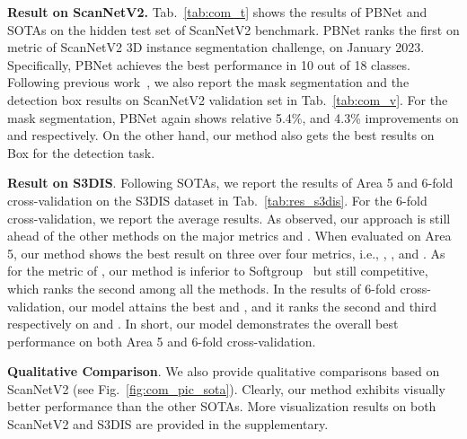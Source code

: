 \documentclass[10pt,twocolumn,letterpaper]{article}
\begin{document}
\noindent\textbf{Result on ScanNetV2.} Tab.~\ref{tab:com_t} shows the  results of PBNet and SOTAs on the hidden test set of ScanNetV2 benchmark. PBNet ranks the first on   metric of ScanNetV2 3D instance segmentation challenge, on January 2023. Specifically, PBNet achieves the best performance in 10 out of 18 classes. Following previous work~\cite{wu2022dknet, vu2022softgroup}, we also report the mask segmentation and the detection box results on ScanNetV2 validation set in Tab.~\ref{tab:com_v}. For the mask segmentation, PBNet again shows relative 5.4\%, and 4.3\% improvements on  and  respectively. On the other hand, our method also gets the best results on Box  for the detection task.





\noindent\textbf{Result on S3DIS}.
Following SOTAs, we report the results of Area 5 and 6-fold cross-validation on the S3DIS dataset  in Tab.~\ref{tab:res_s3dis}. For the 6-fold cross-validation, we report the average results. As observed, our approach is still ahead of the other methods on the major metrics  and . When evaluated on Area 5,  our method shows  the best result on three over four metrics, i.e., , , and . As for the metric of , our method is inferior to Softgroup~\cite{vu2022softgroup} but still competitive, which ranks the second among all the methods. In the results of 6-fold cross-validation, our model attains the best  and , and it ranks the second and third respectively on   and . In short, our model demonstrates the overall best performance on both Area 5 and 6-fold cross-validation. 

\noindent\textbf{Qualitative Comparison}. We also provide qualitative comparisons based on ScanNetV2 (see Fig.~\ref{fig:com_pic_sota}). Clearly, our method exhibits visually better performance than the other SOTAs. More visualization results on both ScanNetV2 and S3DIS are provided in the supplementary.
\end{document}
